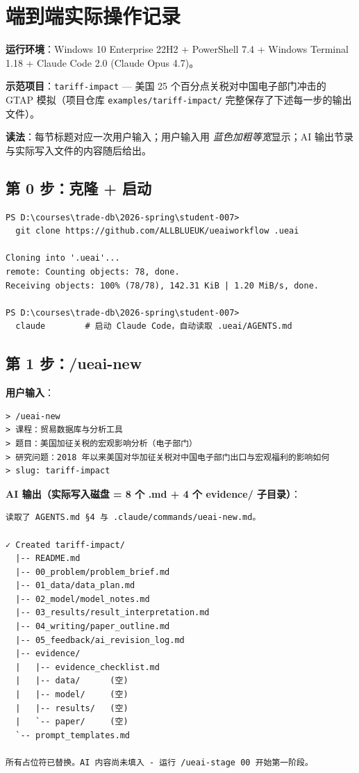 \documentclass[12pt,a4paper]{article}
\begin{document}
\section{端到端实际操作记录}\label{sec:walkthrough}

\textbf{运行环境}：Windows 10 Enterprise 22H2 + PowerShell 7.4 + Windows Terminal 1.18 + Claude Code 2.0 (Claude Opus 4.7)。

\textbf{示范项目}：\texttt{tariff-impact} — 美国 25 个百分点关税对中国电子部门冲击的 GTAP 模拟（项目仓库 \texttt{examples/tariff-impact/} 完整保存了下述每一步的输出文件）。

\textbf{读法}：每节标题对应一次用户输入；用户输入用 \emph{蓝色加粗等宽}显示；AI 输出节录与实际写入文件的内容随后给出。

\subsection{第 0 步：克隆 + 启动}

\begin{lstlisting}[style=shell]
PS D:\courses\trade-db\2026-spring\student-007>
  git clone https://github.com/ALLBLUEUK/ueaiworkflow .ueai

Cloning into '.ueai'...
remote: Counting objects: 78, done.
Receiving objects: 100% (78/78), 142.31 KiB | 1.20 MiB/s, done.

PS D:\courses\trade-db\2026-spring\student-007>
  claude        # 启动 Claude Code，自动读取 .ueai/AGENTS.md
\end{lstlisting}

\subsection{第 1 步：/ueai-new}

\noindent\textbf{用户输入}：
\begin{lstlisting}[style=prompt]
> /ueai-new
> 课程：贸易数据库与分析工具
> 题目：美国加征关税的宏观影响分析（电子部门）
> 研究问题：2018 年以来美国对华加征关税对中国电子部门出口与宏观福利的影响如何
> slug: tariff-impact
\end{lstlisting}

\noindent\textbf{AI 输出（实际写入磁盘 = 8 个 .md + 4 个 evidence/ 子目录）}：
\begin{lstlisting}[style=shell]
读取了 AGENTS.md §4 与 .claude/commands/ueai-new.md。

✓ Created tariff-impact/
  |-- README.md
  |-- 00_problem/problem_brief.md
  |-- 01_data/data_plan.md
  |-- 02_model/model_notes.md
  |-- 03_results/result_interpretation.md
  |-- 04_writing/paper_outline.md
  |-- 05_feedback/ai_revision_log.md
  |-- evidence/
  |   |-- evidence_checklist.md
  |   |-- data/      (空)
  |   |-- model/     (空)
  |   |-- results/   (空)
  |   `-- paper/     (空)
  `-- prompt_templates.md

所有占位符已替换。AI 内容尚未填入 - 运行 /ueai-stage 00 开始第一阶段。
\end{lstlisting}
\end{document}

